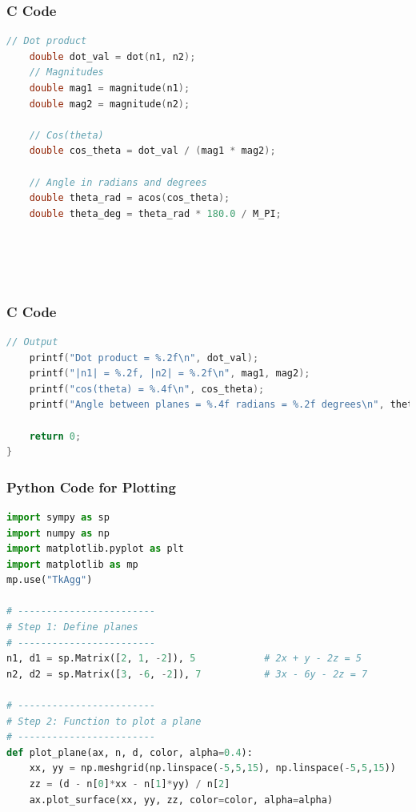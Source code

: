 \documentclass{beamer}
\begin{document}
\begin{frame}[fragile]
\frametitle{C Code }
\begin{lstlisting}[language=C]
 // Dot product
    double dot_val = dot(n1, n2);
    // Magnitudes
    double mag1 = magnitude(n1);
    double mag2 = magnitude(n2);

    // Cos(theta)
    double cos_theta = dot_val / (mag1 * mag2);

    // Angle in radians and degrees
    double theta_rad = acos(cos_theta);
    double theta_deg = theta_rad * 180.0 / M_PI;

   

    
\end{lstlisting}
\end{frame}
\begin{frame}[fragile]
\frametitle{C Code }
\begin{lstlisting}[language=C]
 // Output
    printf("Dot product = %.2f\n", dot_val);
    printf("|n1| = %.2f, |n2| = %.2f\n", mag1, mag2);
    printf("cos(theta) = %.4f\n", cos_theta);
    printf("Angle between planes = %.4f radians = %.2f degrees\n", theta_rad, theta_deg);

    return 0;
}
\end{lstlisting}
\end{frame}
\begin{frame}[fragile]
\frametitle{Python Code for Plotting}
\begin{lstlisting}[language=Python]
import sympy as sp
import numpy as np
import matplotlib.pyplot as plt
import matplotlib as mp
mp.use("TkAgg")

# ------------------------
# Step 1: Define planes
# ------------------------
n1, d1 = sp.Matrix([2, 1, -2]), 5            # 2x + y - 2z = 5
n2, d2 = sp.Matrix([3, -6, -2]), 7           # 3x - 6y - 2z = 7

# ------------------------
# Step 2: Function to plot a plane
# ------------------------
def plot_plane(ax, n, d, color, alpha=0.4):
    xx, yy = np.meshgrid(np.linspace(-5,5,15), np.linspace(-5,5,15))
    zz = (d - n[0]*xx - n[1]*yy) / n[2]
    ax.plot_surface(xx, yy, zz, color=color, alpha=alpha)

\end{lstlisting}

\end{frame}
\end{document}
